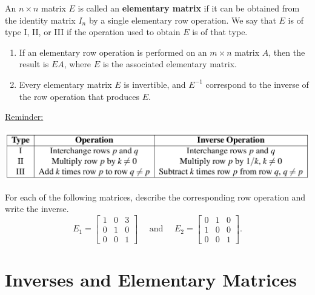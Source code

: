 \documentclass[20pt,a4paper]{extarticle}
\newcounter{example}
\newcounter{theorem}
\newcounter{definition}
\begin{document}
\newpage 

\begin{definition}
An $n \times n$ matrix $E$ is called an \textbf{elementary matrix} if it can be obtained from the identity matrix $I_n$ by a single elementary row operation. We say that $E$ is of type I, II, or III if the operation used to obtain $E$ is of that type.
\end{definition}

\begin{theorem}
\begin{enumerate}
	\item If an elementary row operation is performed on an $m \times n$ matrix $A$, then the result is $EA$, where $E$ is the associated elementary matrix.
	\item Every elementary matrix $E$ is invertible, and $E^{-1}$ correspond to the inverse of the row operation that produces $E$.
\end{enumerate}
\end{theorem}

\underline{Reminder:}
	\begin{center}
	\includegraphics[scale=0.4]{table-reminder.png}
	\end{center}

\begin{example}
For each of the following matrices, describe the corresponding row operation and write the inverse.
	\[
		E_1 = \begin{bmatrix} 
		1 & 0 & 3 \\ 0 & 1 & 0 \\ 0 & 0 & 1 \end{bmatrix} \quad \text{ and } \quad E_2 = \begin{bmatrix} 0 & 1 & 0 \\ 1 & 0 & 0 \\ 0 & 0 & 1 \end{bmatrix} .
	\]
\end{example}

\newpage 

\section{Inverses and Elementary Matrices}
\end{document}
